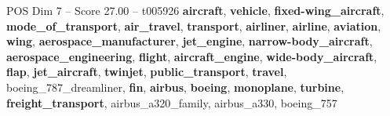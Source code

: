 \begin{textsample}{POS Dim 7 – Score 27.00 – t005926}  \label{ex:f7_pos_005}
\textbf{aircraft}, \textbf{vehicle}, \textbf{fixed-wing\_aircraft}, \textbf{mode\_of\_transport}, \textbf{air\_travel}, \textbf{transport}, \textbf{airliner}, \textbf{airline}, \textbf{aviation}, \textbf{wing}, \textbf{aerospace\_manufacturer}, \textbf{jet\_engine}, \textbf{narrow-body\_aircraft}, \textbf{aerospace\_engineering}, \textbf{flight}, \textbf{aircraft\_engine}, \textbf{wide-body\_aircraft}, \textbf{flap}, \textbf{jet\_aircraft}, \textbf{twinjet}, \textbf{public\_transport}, \textbf{travel}, boeing\_787\_dreamliner, \textbf{fin}, \textbf{airbus}, \textbf{boeing}, \textbf{monoplane}, \textbf{turbine}, \textbf{freight\_transport}, airbus\_a320\_family, airbus\_a330, boeing\_757

\end{textsample}
